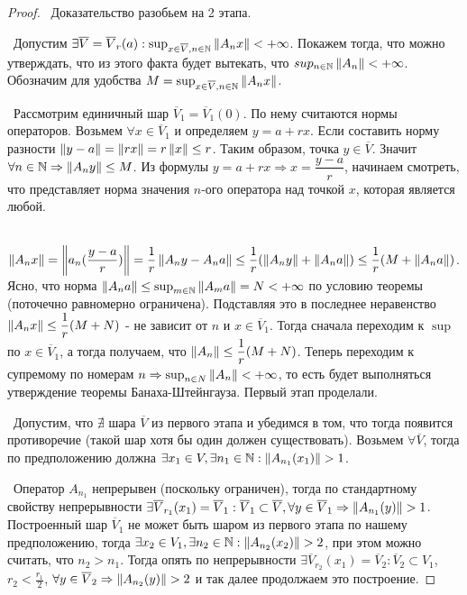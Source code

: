 \begin{proof}
\smallskip 
\par\noindent\textbullet~Доказательство разобьем на 2 этапа.

\smallskip
\noindent\textbullet~Допустим $\exists \overline{V} = \overline{V}_r(a) : \sup_{x \in \overline{V}, n \in \mathbb{N}} \left\lVert A_n x\right\rVert < +\infty$. Покажем тогда, что можно 
утверждать, что из этого факта будет вытекать, что $sup_{n \in \mathbb{N}} \left\lVert A_n\right\rVert < +\infty$. Обозначим для удобства $M = \sup_{x \in \overline{V}, n \in \mathbb{N}}
\left\lVert A_n x\right\rVert$. 

\smallskip
\noindent\textbullet~Рассмотрим единичный шар $\overline{V}_1 = \overline{V}_1(0)$. По нему считаются нормы операторов. Возьмем $\forall x \in \overline{V}_1$ и определяем 
$y = a + r x$. Если составить норму разности $\left\lVert y - a\right\rVert = \left\lVert r x\right\rVert = r \left\lVert x\right\rVert \le r$. Таким образом, точка $y \in \overline{V}$. Значит $\forall n \in \mathbb{N}
\Rightarrow \left\lVert A_n y\right\rVert \le M$. Из формулы $y = a + rx \Rightarrow x = \dfrac{y - a}{r}$, начинаем смотреть, что представляет норма значения $n$-ого оператора над точкой 
$x$, которая является любой.

\smallskip
\noindent\textbullet~$\left\lVert A_n x\right\rVert = \left\lVert a_n (\dfrac{y - a}{r})\right\rVert = \dfrac{1}{r} \left\lVert A_n y - A_n a\right\rVert \le \dfrac{1}{r}(\left\lVert A_n y\right\rVert + \left\lVert A_n a\right\rVert) \le \dfrac{1}{r} 
(M + \left\lVert A_n a\right\rVert)$. Ясно, что норма $\left\lVert A_n a\right\rVert \le \sup_{m \in \mathbb{N}} \left\lVert A_m a\right\rVert = N < + \infty$ по условию теоремы (поточечно равномерно ограничена). 
Подставляя это в последнее неравенство $\left\lVert A_n x\right\rVert \le \dfrac{1}{r} (M + N)$ - не зависит от $n$ и $x \in \overline{V}_1$. Тогда сначала переходим к $\sup$ по $x \in 
\overline{V}_1$, а тогда получаем, что $\left\lVert A_n\right\rVert \le \dfrac{1}{r}(M + N)$. Теперь переходим к супремому по номерам $n \Rightarrow \sup_{n \in N} \left\lVert A_n\right\rVert < + \infty$,
то есть будет выполняться утверждение теоремы Банаха-Штейнгауза. Первый этап проделали.

\medskip
\noindent\textbullet~Допустим, что $\nexists$ шара $\overline{V}$ из первого этапа и убедимся в том, что тогда появится противоречие 
(такой шар хотя бы один должен существовать). Возьмем $\forall \overline{V}$, тогда по предположению должна $\exists x_1 \in V, \exists n_1 \in \mathbb{N} : 
\left\lVert A_{n_1}(x_1)\right\rVert > 1$. 

\smallskip
\noindent\textbullet~Оператор $A_{n_1}$ непрерывен (поскольку ограничен), тогда по стандартному свойству непрерывности $\exists \overline{V}_{r_1}(x_1) = \overline{V}_1 : 
\overline{V}_1 \subset \overline{V}, \forall y \in \overline{V}_1 \Rightarrow \left\lVert A_{n_1}(y)\right\rVert > 1$. Построенный шар $\overline{V}_1$ не может быть шаром из первого 
этапа по нашему предположению, тогда $\exists x_2 \in V_1, \exists n_2 \in \mathbb{N} : \left\lVert A_{n_2}(x_2)\right\rVert > 2$, при этом можно считать, что $n_2 > n_1$. Тогда опять по 
непрерывности $\exists \overline{V}_{r_2} (x_1) = \overline{V}_2 : \overline{V}_2 \subset V_1$, $r_2 < \frac{r_1}{2}$, $\forall y \in \overline{V}_2 \Rightarrow 
\left\lVert A_{n_2}(y)\right\rVert > 2$ и так далее продолжаем это построение.


\end{proof}
